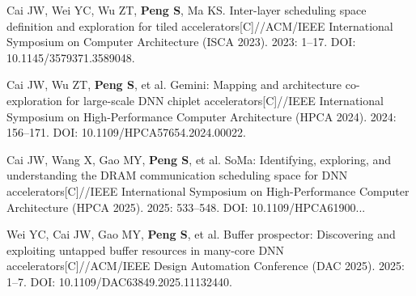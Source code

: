 \begin{achievelist}
    \item Cai JW, Wei YC, Wu ZT, \textbf{Peng S}, Ma KS. Inter-layer scheduling space definition and exploration for tiled accelerators[C]//ACM/IEEE International Symposium on Computer Architecture (ISCA 2023). 2023: 1--17. DOI: 10.1145/3579371.3589048.
    \item Cai JW, Wu ZT, \textbf{Peng S}, et al. Gemini: Mapping and architecture co-exploration for large-scale DNN chiplet accelerators[C]//IEEE International Symposium on High-Performance Computer Architecture (HPCA 2024). 2024: 156--171. DOI: 10.1109/HPCA57654.2024.00022.
    {\sloppy\item Cai JW, Wang X, Gao MY, \textbf{Peng S}, et al. SoMa: Identifying, exploring, and understanding the DRAM communication scheduling space for DNN accelerators[C]//IEEE International Symposium on High-Performance Computer Architecture (HPCA 2025). 2025: 533--548. DOI: 10.1109/\allowbreak HPCA61900...\par}
    \item Wei YC, Cai JW, Gao MY, \textbf{Peng S}, et al. Buffer prospector: Discovering and exploiting untapped buffer resources in many-core DNN accelerators[C]//ACM/IEEE Design Automation Conference (DAC 2025). 2025: 1--7. DOI: 10.1109/DAC63849.2025.11132440.
\end{achievelist}

